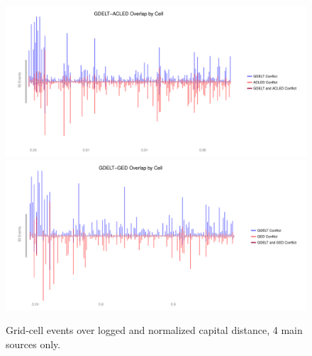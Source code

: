 \documentclass[hidelinks]{article}
\begin{document}
\begin{figure}[!htbp]
\includegraphics[width = 1 \textwidth]{spaceACLED4source.pdf}\\
\includegraphics[width = 1 \textwidth]{spaceGED4source.pdf}
\caption{Grid-cell events over logged and normalized capital distance, 4 main sources only.}\label{fig:correlations_space}
\end{figure}
\end{document}
